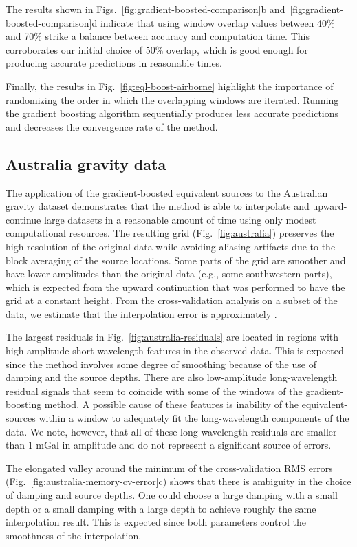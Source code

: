 The results shown in Figs.~\ref{fig:gradient-boosted-comparison}b
and~\ref{fig:gradient-boosted-comparison}d indicate that using
window overlap values between 40\% and 70\% strike a balance between
accuracy and computation time.
This corroborates our initial choice of 50\% overlap, which is good enough for
producing accurate predictions in reasonable times.

Finally, the results in Fig.~\ref{fig:eql-boost-airborne} highlight the
importance of randomizing the order in which the overlapping windows are
iterated.
Running the gradient boosting algorithm sequentially produces less accurate
predictions and decreases the convergence rate of the method.

\subsection{Australia gravity data}

The application of the gradient-boosted equivalent sources to the Australian
gravity dataset demonstrates that the method is able to interpolate and
upward-continue large datasets in a reasonable amount of time using only modest
computational resources.
The resulting grid (Fig.~\ref{fig:australia}) preserves the high resolution of
the original data while avoiding aliasing artifacts due to the block averaging
of the source locations.
Some parts of the grid are smoother and have lower amplitudes than the original
data (e.g., some southwestern parts), which is expected from the upward
continuation that was performed to have the grid at a constant height.
From the cross-validation analysis on a subset of the data, we estimate that
the interpolation error is approximately \AustraliaEqlRmsScore{}.

The largest residuals in Fig.~\ref{fig:australia-residuals} are located in
regions with high-amplitude short-wavelength features in the observed data.
This is expected since the method involves some degree of smoothing because of
the use of damping and the source depths.
There are also low-amplitude long-wavelength residual signals that seem to
coincide with some of the windows of the gradient-boosting method.
A possible cause of these features is inability of the equivalent-sources
within a window to adequately fit the long-wavelength components of the data.
We note, however, that all of these long-wavelength residuals are smaller than
1 mGal in amplitude and do not represent a significant source of errors.

The elongated valley around the minimum of the cross-validation RMS errors
(Fig.~\ref{fig:australia-memory-cv-error}c) shows that there is ambiguity in
the choice of damping and source depths.
One could choose a large damping with a small depth or a small damping with a
large depth to achieve roughly the same interpolation result.
This is expected since both parameters control the smoothness of the
interpolation.

